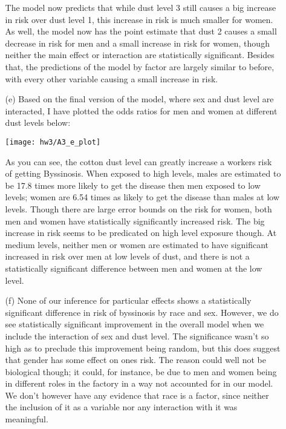 \documentclass[11pt]{article}
\theoremstyle{definition}
\begin{document}
\begin{itemize}
\begin{itemize}
                \FloatBarrier
                
                \FloatBarrier
                The model now predicts that while dust level 3 still causes a big increase in risk over dust level 1, this increase in risk is much smaller for women. As well, the model now has the point estimate that dust 2 causes a small decrease in risk for men and a small increase in risk for women, though neither the main effect or interaction are statistically significant. Besides that, the predictions of the model by factor are largely similar to before, with every other variable causing a small increase in risk.
            \item[(e)]
                Based on the final version of the model, where sex and dust level are interacted, I have plotted the odds ratios for men and women at different dust levels below:
                \begin{center}
                    \texttt{[image: hw3/A3\_e\_plot]} 
                \end{center}
                As you can see, the cotton dust level can greatly increase a workers risk of getting Byssinosis. When exposed to high levels, males are estimated to be 17.8 times more likely to get the disease then men exposed to low levels; women are 6.54 times as likely to get the disease than males at low levels. Though there are large error bounds on the risk for women, both men and women have statistically significantly increased risk. The big increase in risk seems to be predicated on high level exposure though. At medium levels, neither men or women are estimated to have significant increased in risk over men at low levels of dust, and there is not a statistically significant difference between men and women at the low level.
            \item[(f)]
                None of our inference for particular effects shows a statistically significant difference in risk of byssinosis by race and sex. However, we do see statistically significant improvement in the overall model when we include the interaction of sex and dust level. The significance wasn't so high as to preclude this improvement  being random, but this does suggest that gender has some effect on ones risk. The reason could well not be biological though; it could, for instance, be due to men and women being in different roles in the factory in a way not accounted for in our model. We don't however have any evidence that race is a factor, since neither the inclusion of it as a variable nor any interaction with it was meaningful.


        \end{itemize}
\end{itemize}
\end{document}
